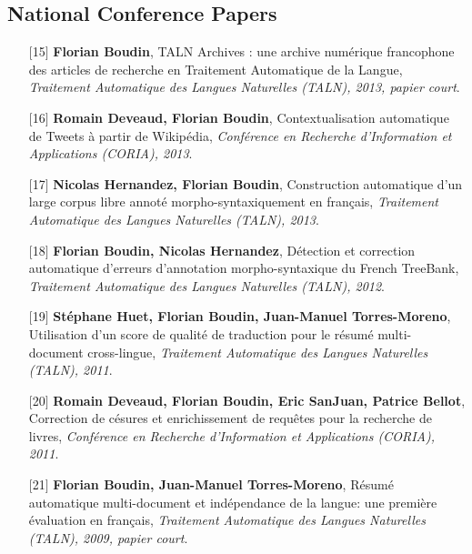 \documentclass[11pt,a4paper]{moderncv}
\begin{document}
    \subsection{National Conference Papers}
    \begin{itemize}[leftmargin=1.2cm,itemsep=0.1cm]
        \item[{\small$[$15$]$}] \textbf{Florian Boudin}, TALN Archives : une archive numérique francophone des articles de recherche en Traitement Automatique de la Langue, \textit{Traitement Automatique des Langues Naturelles (TALN), 2013, papier court}.
        \item[{\small$[$16$]$}] \textbf{Romain Deveaud, Florian Boudin}, Contextualisation automatique de Tweets à partir de Wikipédia, \textit{Conférence en Recherche d'Information et Applications (CORIA), 2013}.
        \item[{\small$[$17$]$}] \textbf{Nicolas Hernandez, Florian Boudin}, Construction automatique d'un large corpus libre annoté morpho-syntaxiquement en français, \textit{Traitement Automatique des Langues Naturelles (TALN), 2013}.
        \item[{\small$[$18$]$}] \textbf{Florian Boudin, Nicolas Hernandez}, Détection et correction automatique d'erreurs d'annotation morpho-syntaxique du French TreeBank, \textit{Traitement Automatique des Langues Naturelles (TALN), 2012}.
        \item[{\small$[$19$]$}] \textbf{Stéphane Huet, Florian Boudin, Juan-Manuel Torres-Moreno}, Utilisation d'un score de qualité de traduction pour le résumé multi-document cross-lingue, \textit{Traitement Automatique des Langues Naturelles (TALN), 2011}.
        \item[{\small$[$20$]$}] \textbf{Romain Deveaud, Florian Boudin, Eric SanJuan, Patrice Bellot}, Correction de césures et enrichissement de requêtes pour la recherche de livres, \textit{Conférence en Recherche d'Information et Applications (CORIA), 2011}.
        \item[{\small$[$21$]$}] \textbf{Florian Boudin, Juan-Manuel Torres-Moreno}, Résumé automatique multi-document et indépendance de la langue: une première évaluation en français, \textit{Traitement Automatique des Langues Naturelles (TALN), 2009, papier court}.
    \end{itemize}
\end{document}
